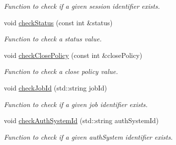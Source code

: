 \begin{DoxyCompactItemize}
\begin{DoxyCompactList}\small\item\em Function to check if a given session identifier exists. \item\end{DoxyCompactList}\item 
void \hyperlink{classQueryServer_a358f371f74bcb2dd3e789bd20d0cb672}{checkStatus} (const int \&status)
\begin{DoxyCompactList}\small\item\em Function to check a status value. \item\end{DoxyCompactList}\item 
void \hyperlink{classQueryServer_a73cc37f1e18f4e5028d8f4d68b9b148f}{checkClosePolicy} (const int \&closePolicy)
\begin{DoxyCompactList}\small\item\em Function to check a close policy value. \item\end{DoxyCompactList}\item 
void \hyperlink{classQueryServer_add7b3dc1799367f27cf0160a5ac63ecf}{checkJobId} (std::string jobId)
\begin{DoxyCompactList}\small\item\em Function to check if a given job identifier exists. \item\end{DoxyCompactList}\item 
void \hyperlink{classQueryServer_ad765a449dc41871997166fba5a57a854}{checkAuthSystemId} (std::string authSystemId)
\begin{DoxyCompactList}\small\item\em Function to check if a given authSystem identifier exists. \item\end{DoxyCompactList}\end{DoxyCompactItemize}
